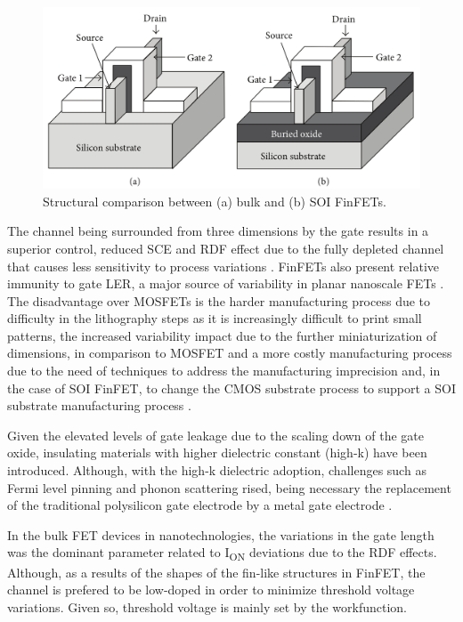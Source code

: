 \documentclass[pgmicro,mestrado,english]{iiufrgs}
\begin{document}
    \begin{figure} []
        \centering
        \includegraphics[width=\textwidth, trim={0 0 0 0},clip]{finfet2.png}
        \caption{Structural comparison between (a) bulk and (b) SOI FinFETs.}
        \label{bulkvssoi}
    \end{figure}

The channel being surrounded from three dimensions by the gate results in a superior control, reduced SCE and RDF effect due to the fully depleted channel that causes less sensitivity to process variations \cite{taur2013fundamentals}. FinFETs also present relative immunity to gate LER, a major source of variability in planar nanoscale FETs \cite{finfetchar1}. The disadvantage over MOSFETs is the harder manufacturing process due to difficulty in the lithography steps as it is increasingly difficult to print small patterns, the increased variability impact due to the further miniaturization of dimensions, in comparison to MOSFET and a more costly manufacturing process due to the need of techniques to address the manufacturing imprecision and, in the case of SOI FinFET, to change the CMOS substrate process to support a SOI substrate manufacturing process \cite{finfetchar1} \cite{finfetdis}.

Given the elevated levels of gate leakage due to the scaling down of the gate oxide, insulating materials with higher dielectric constant (high-k) have been introduced. Although, with the high-k dielectric adoption, challenges such as Fermi level pinning \cite{hobbs2004fermi} and phonon scattering \cite{gusev2006advanced} rised, being necessary the replacement of the traditional polysilicon gate electrode by a metal gate electrode \cite{gusev2001ultrathin, datta2003high}.

In the bulk FET devices in nanotechnologies, the variations in the gate length was the dominant parameter related to I\textsubscript{ON} deviations due to the RDF effects. Although, as a results of the shapes of the fin-like structures in FinFET, the channel is prefered to be low-doped in order to minimize threshold voltage variations. Given so, threshold voltage is mainly set by the workfunction.
\end{document}
